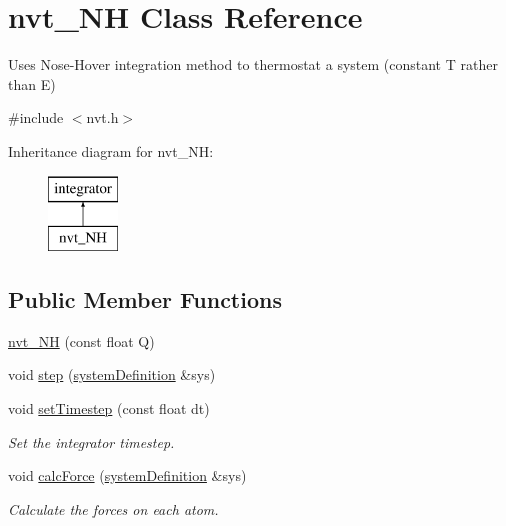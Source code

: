 \hypertarget{classnvt___n_h}{\section{nvt\-\_\-\-N\-H Class Reference}
\label{classnvt___n_h}
}


Uses Nose-\/\-Hover integration method to thermostat a system (constant T rather than E)  




{\ttfamily \#include $<$nvt.\-h$>$}

Inheritance diagram for nvt\-\_\-\-N\-H\-:\begin{figure}[H]
\begin{center}
\leavevmode
\includegraphics[height=2.000000cm]{classnvt___n_h}
\end{center}
\end{figure}
\subsection*{Public Member Functions}
\begin{DoxyCompactItemize}
\item 
\hyperlink{classnvt___n_h_a2de57e4e2a370bbfc8c0026963352ef1}{nvt\-\_\-\-N\-H} (const float Q)
\item 
void \hyperlink{classnvt___n_h_aa5b74d6b986c65e4436fed6ea6c14b20}{step} (\hyperlink{classsystem_definition}{system\-Definition} \&sys)
\item 
\hypertarget{classintegrator_a493bed6cf5d45fe41a9a6430bd063106}{void \hyperlink{classintegrator_a493bed6cf5d45fe41a9a6430bd063106}{set\-Timestep} (const float dt)}\label{classintegrator_a493bed6cf5d45fe41a9a6430bd063106}

\begin{DoxyCompactList}\small\item\em Set the integrator timestep. \end{DoxyCompactList}\item 
void \hyperlink{classintegrator_ad630bf7c9b7339fa34f36fe43b0d9e3c}{calc\-Force} (\hyperlink{classsystem_definition}{system\-Definition} \&sys)
\begin{DoxyCompactList}\small\item\em Calculate the forces on each atom. \end{DoxyCompactList}\end{DoxyCompactItemize}
